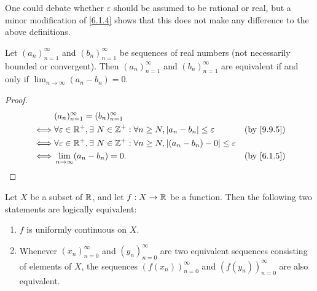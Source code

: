 \begin{rmk}\label{9.9.6}
  One could debate whether \(\varepsilon\) should be assumed to be rational or real, but a minor modification of \cref{6.1.4} shows that this does not make any difference to the above definitions.
\end{rmk}

\begin{lem}\label{9.9.7}
  Let \((a_n)_{n = 1}^\infty\) and \((b_n)_{n = 1}^\infty\) be sequences of real numbers
  (not necessarily bounded or convergent).
  Then \((a_n)_{n = 1}^\infty\) and \((b_n)_{n = 1}^\infty\) are equivalent if and only if \(\lim_{n \to \infty} (a_n - b_n) = 0\).
\end{lem}

\begin{proof}
  \begin{align*}
         & (a_n)_{n = 1}^\infty = (b_n)_{n = 1}^\infty                                                                                             \\
    \iff & \forall \varepsilon \in \R^+, \exists\ N \in \Z^+ : \forall n \geq N, \abs{a_n - b_n} \leq \varepsilon       & \text{(by \cref{9.9.5})} \\
    \iff & \forall \varepsilon \in \R^+, \exists\ N \in \Z^+ : \forall n \geq N, \abs{(a_n - b_n) - 0} \leq \varepsilon                            \\
    \iff & \lim_{n \to \infty} (a_n - b_n) = 0.                                                                         & \text{(by \cref{6.1.5})}
  \end{align*}
\end{proof}

\begin{prop}\label{9.9.8}
  Let \(X\) be a subset of \(\mathbb{R}\), and let \(f : X \to \mathbb{R}\) be a function.
  Then the following two statements are logically equivalent:
  \begin{enumerate}
    \item \(f\) is uniformly continuous on \(X\).
    \item Whenever \((x_n)_{n = 0}^\infty\) and \((y_n)_{n = 0}^\infty\) are two equivalent sequences consisting of elements of \(X\), the sequences \((f(x_n))_{n = 0}^\infty\) and \((f(y_n))_{n = 0}^\infty\) are also equivalent.
  \end{enumerate}
\end{prop}

